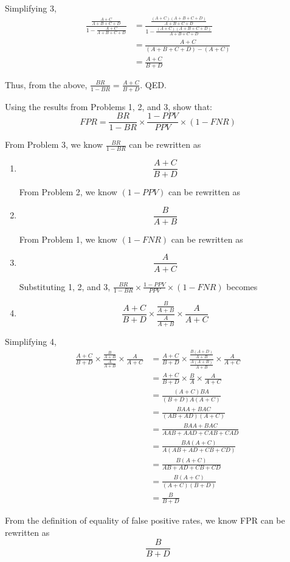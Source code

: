 \documentclass{cisXXX} %
\begin{document}
Simplifying 3,
\begin{align*}
\frac{\frac{A+C}{A+B+C+D}}{1-\frac{A+C}{A+B+C+D}} &= \frac{\frac{(A+C)(A+B+C+D)}{A+B+C+D}}{1-\frac{(A+C)(A+B+C+D)}{A+B+C+D}}\\
&= \frac{A+C}{(A+B+C+D) - (A+C)}\\
&= \frac{A+C}{B+D}
\end{align*}

Thus, from the above, $\frac{BR}{1-BR} = \frac{A+C}{B+D}$. QED.

\HWproblem
Using the results from Problems 1, 2, and 3, show that:
$$FPR = \frac{BR}{1-BR}\times\frac{1-PPV}{PPV}\times(1 -FNR)$$

From Problem 3, we know $\frac{BR}{1-BR}$ can be rewritten as
\begin{enumerate}
\item $$\frac{A+C}{B+D}$$

From Problem 2, we know $(1-PPV)$ can be rewritten as
\item $$\frac{B}{A+B}$$

From Problem 1, we know $(1-FNR)$ can be rewritten as
\item $$\frac{A}{A+C}$$

Substituting 1, 2, and 3, $\frac{BR}{1-BR}\times\frac{1-PPV}{PPV}\times(1 -FNR)$ becomes
\item $$\frac{A+C}{B+D}\times\frac{\frac{B}{A+B}}{\frac{A}{A+B}}\times\frac{A}{A+C}$$
\end{enumerate}

Simplifying 4,
\begin{align*}
\frac{A+C}{B+D}\times\frac{\frac{B}{A+B}}{\frac{A}{A+B}}\times\frac{A}{A+C} &= \frac{A+C}{B+D}\times\frac{\frac{B(A+D)}{A+B}}{\frac{A(A+B)}{A+B}}\times\frac{A}{A+C}\\
&= \frac{A+C}{B+D}\times\frac{B}{A}\times\frac{A}{A+C}\\
&= \frac{(A+C)BA}{(B+D)A(A+C)}\\
&= \frac{BAA+BAC}{(AB+AD)(A+C)}\\
&= \frac{BAA+BAC}{AAB+AAD+CAB+CAD}\\
&= \frac{BA(A+C)}{A(AB+AD+CB+CD)}\\
&= \frac{B(A+C)}{AB+AD+CB+CD}\\
&= \frac{B(A+C)}{(A+C)(B+D)}\\
&= \frac{B}{B+D}
\end{align*}

From the definition of equality of false positive rates, we know FPR can be rewritten as
$$\frac{B}{B+D}$$
\end{document}
